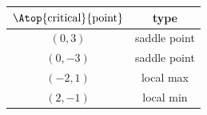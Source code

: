 %

\begin{answer}
\renewcommand{\arraystretch}{1.3}
     \begin{tabular}{|c|c|}
     \hline
    $\Atop{\text{critical}}{\text{point}}$   & type \\    
    \hline
     $(0,3)$  &   saddle point  \\ \hline
     $(0,-3)$  &  saddle point \\  \hline
     $(-2,1)$  &  local max \\  \hline
     $(2,-1)$  &  local min \\  \hline
     \end{tabular}
\renewcommand{\arraystretch}{1.0}
\end{answer}

